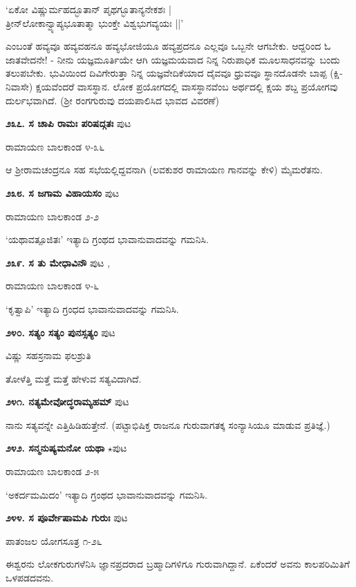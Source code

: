{\begin{shloka}
`ಏಕೋ ವಿಷ್ಣುರ್ಮಹದ್ಭೂತಾನ್ ಪೃಥಗ್ಭೂತಾನ್ಯನೇಕಶಃ |\\
ತ್ರೀನ್‌ಲೋಕಾನ್ವ್ಯಾಪ್ಯಭೂತಾತ್ಮಾ ಭುಂಕ್ತೇ ವಿಶ್ವಭುಗವ್ಯಯಃ ||'
\end{shloka}
ಎಂಬಂತೆ ಹವ್ಯವೂ ಹವ್ಯವಹನೂ ಹವ್ಯಭೋಜಿಯೂ ಹವ್ಯಪ್ರದನೂ ಎಲ್ಲವೂ ಒಬ್ಬನೇ ಆಗಬೇಕು. ಆದ್ದರಿಂದ ಓ ಜಾತವೇದನೇ! - ನೀನು ಯಜ್ಞಮೂರ್ತಿಯೇ ಆಗಿ ಯಜ್ಞಮಯವಾದ ನಿನ್ನ ನಿರುಪಾಧಿಕ ಮೂಲಸಾಧನವನ್ನು ಬಂದು ತಲುಪಬೇಕು. ಭುವಿಯಿಂದ ದಿವಿಗೇರುತ್ತಾ ನಿನ್ನ ಯಜ್ಞವೇದಿಕೆಯಾದ ದೈವವೂ ಧ್ರುವವೂ ಸ್ಥಾನದೊಡನೇ ಬಾಪ್ಪ (ಕ್ಷಿ-ನಿವಾಸೇ) ಕ್ಷಯವೆಂದರೆ ವಾಸಸ್ಥಾನ. ಲೋಕ ಪ್ರಯೋಗದಲ್ಲಿ ವಾಸಸ್ಥಾನವೆಂಬ ಅರ್ಥದಲ್ಲಿ ಕ್ಷಯ ಶಬ್ದ ಪ್ರಯೋಗವು ದುರ್ಲಭವಾಗಿದೆ. (ಶ್ರೀ ರಂಗಗುರುವು ದಯಪಾಲಿಸಿದ ಭಾವದ ವಿವರಣೆ)

\medskip
\noindent\textbf{೨೩೭. ಸ ಚಾಪಿ ರಾಮಃ ಪರಿಷದ್ಗತಃ} \hfill ಪುಟ \pageref{168}

\hfill ರಾಮಾಯಣ ಬಾಲಕಾಂಡ ೪-೩೬

ಆ ಶ್ರೀರಾಮಚಂದ್ರನೂ ಸಹ ಸಭೆಯಲ್ಲಿದ್ದವನಾಗಿ (ಲವಕುಶರ ರಾಮಾಯಣ ಗಾನವನ್ನು ಕೇಳಿ) ಮೈಮರೆತನು.

\medskip
\noindent\textbf{೨೩೮. ಸ ಜಗಾಮ ವಿಹಾಯಸಂ} \hfill ಪುಟ \pageref{163}

\hfill ರಾಮಾಯಣ ಬಾಲಕಾಂಡ ೨-೨

`ಯಥಾವತ್ಪೂಜಿತಃ' ಇತ್ಯಾದಿ ಗ್ರಂಥದ ಭಾವಾನುವಾದವನ್ನು ಗಮನಿಸಿ.

\medskip
\noindent\textbf{೨೩೯. ಸ ತು ಮೇಧಾವಿನೌ} \hfill ಪುಟ \pageref{239},\pageref{240}

\hfill ರಾಮಾಯಣ ಬಾಲಕಾಂಡ ೪-೬

`ಕೃತ್ವಾಪಿ' ಇತ್ಯಾದಿ ಗ್ರಂಧದ ಭಾವಾನುವಾದವನ್ನು ಗಮನಿಸಿ.

\medskip
\noindent\textbf{೨೪೦. ಸತ್ಯಂ ಸತ್ಯಂ ಪುನಸ್ಸತ್ಯಂ} \hfill ಪುಟ \pageref{130}

\hfill ವಿಷ್ಣು ಸಹಸ್ರನಾಮ ಫಲಶ್ರುತಿ

ತೋಳೆತ್ತಿ ಮತ್ತೆ ಮತ್ತೆ ಹೇಳುವ ಸತ್ಯವಿದಾಗಿದೆ.

\medskip
\noindent\textbf{೨೪೧. ನತ್ಯಮೇವೋದ್ಧರಾಮ್ಯಹಮ್} \hfill ಪುಟ \pageref{40}

ನಾನು ಸತ್ಯವನ್ನೇ ಎತ್ತಿಹಿಡಿಹುತ್ತೇನೆ. (ಪಟ್ಟಾಭಿಷಿಕ್ತ ರಾಜನೂ ಗುರುವಾಗತಕ್ಕ ಸಂನ್ಯಾಸಿಯೂ ಮಾಡುವ ಪ್ರತಿಜ್ಞೆ.)

\medskip
\noindent\textbf{೨೪೨. ಸನ್ಮನುಷ್ಯಮನೋ ಯಥಾ} $\star$\hfill ಪುಟ \pageref{197}

\hfill ರಾಮಾಯಣ ಬಾಲಕಾಂಡ ೨-೫

`ಅಕರ್ದಮಮಿದಂ' ಇತ್ಯಾದಿ ಗ್ರಂಥದ ಭಾವಾನುವಾದವನ್ನು ಗಮನಿಸಿ.

\medskip
\noindent\textbf{೨೪೪. ಸ ಪೂರ್ವೇಷಾಮಪಿ ಗುರುಃ} \hfill ಪುಟ \pageref{129}

\hfill ಪಾತಂಜಲ ಯೋಗಸೂತ್ರ ೧-೨೬

ಈಶ್ವರನು ಲೋಕಗುರುಗಳೆನಿಸಿ ಜ್ಞಾನಪ್ರದರಾದ ಬ್ರಹ್ಮಾದಿಗಳಿಗೂ ಗುರುವಾಗಿದ್ದಾನೆ. ಏಕೆಂದರೆ ಅವನು ಕಾಲಪರಿಮಿತಿಗೆ ಒಳಪಡದವನು.

}
